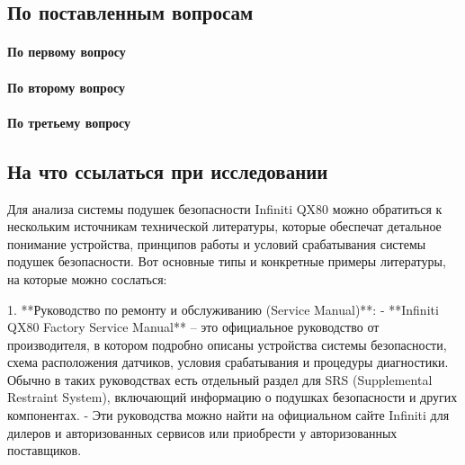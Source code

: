 \subsection{  }
\par
%

\subsection{По поставленным вопросам }
\par

\paragraph{{По первому вопросу}}
\par

\paragraph{{По второму вопросу}}
\par

\paragraph{{По третьему вопросу}}
\par





\subsection{На что ссылаться при исследовании}    	

Для анализа системы подушек безопасности Infiniti QX80 можно обратиться к нескольким источникам технической литературы, которые обеспечат детальное понимание устройства, принципов работы и условий срабатывания системы подушек безопасности. Вот основные типы и конкретные примеры литературы, на которые можно сослаться:

1. **Руководство по ремонту и обслуживанию (Service Manual)**:
- **Infiniti QX80 Factory Service Manual** – это официальное руководство от производителя, в котором подробно описаны устройства системы безопасности, схема расположения датчиков, условия срабатывания и процедуры диагностики. Обычно в таких руководствах есть отдельный раздел для SRS (Supplemental Restraint System), включающий информацию о подушках безопасности и других компонентах.
- Эти руководства можно найти на официальном сайте Infiniti для дилеров и авторизованных сервисов или приобрести у авторизованных поставщиков.

